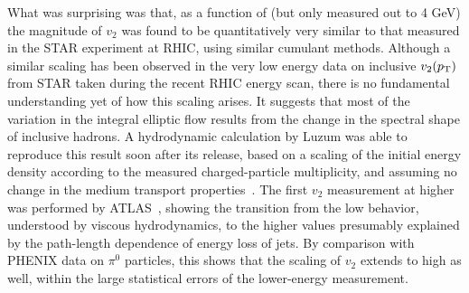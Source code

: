 What was surprising was that, as a function of \pT (but only measured out to 4 GeV)
the magnitude of $v_2$ was found to be quantitatively very similar to that measured in
the STAR experiment at RHIC, using similar cumulant methods.
Although a similar scaling has been observed in the very low energy
data on inclusive $v_2(\mbox{$p_{\mathrm{T}}$})$ from STAR taken during the recent RHIC energy scan,
there is no fundamental understanding yet of how this scaling arises.
It suggests that most of the variation in the integral elliptic flow results from the change in the spectral shape
of inclusive hadrons.
A hydrodynamic calculation by Luzum was able to reproduce this result soon after its release,
based on a scaling of the initial energy density according to the measured charged-particle
multiplicity, and assuming no change in the medium transport properties~\cite{Luzum:2010ag}.
The first $v_2$ measurement at higher \pT was performed by ATLAS~\cite{ATLAS:2011ah},
showing the transition from the low \pT behavior,
understood by viscous hydrodynamics, to the higher \pT values presumably explained by the path-length dependence of
energy loss of jets.
By comparison with PHENIX data on $\pi^0$ particles, this shows that the scaling of $v_2$ extends to high \pT as well,
within the large statistical errors of the lower-energy measurement.

